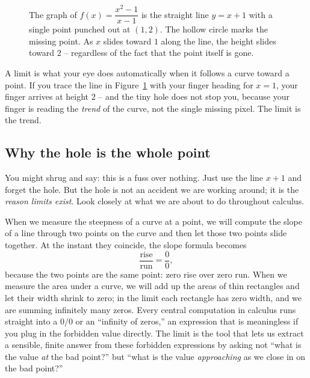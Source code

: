 \begin{figure}[H]
\centering
{}
\caption{The graph of $f(x)=\dfrac{x^2-1}{x-1}$ is the straight line $y=x+1$ with a single
point punched out at $(1,2)$. The hollow circle marks the missing point. As $x$ slides toward
$1$ along the line, the height slides toward $2$ -- regardless of the fact that the point
itself is gone.}
\label{ch05:hole}
\end{figure}

\begin{intuitionbox}
A limit is what your eye does automatically when it follows a curve toward a point. If you trace
the line in Figure~\ref{ch05:hole} with your finger heading for $x=1$, your finger arrives at
height $2$ -- and the tiny hole does not stop you, because your finger is reading the
\emph{trend} of the curve, not the single missing pixel. The limit is the trend.
\end{intuitionbox}

\subsection{Why the hole is the whole point}

You might shrug and say: this is a fuss over nothing. Just use the line $x+1$ and forget the
hole. But the hole is not an accident we are working around; it is the \emph{reason limits
exist}. Look closely at what we are about to do throughout calculus.

When we measure the steepness of a curve at a point, we will compute the slope of a line
through two points on the curve and then let those two points slide together. At the instant
they coincide, the slope formula becomes
\[
  \frac{\text{rise}}{\text{run}} = \frac{0}{0},
\]
because the two points are the same point: zero rise over zero run. When we measure the area
under a curve, we will add up the areas of thin rectangles and let their width shrink to zero;
in the limit each rectangle has zero width, and we are summing infinitely many zeros. Every
central computation in calculus runs straight into a $0/0$ or an ``infinity of zeros,'' an
expression that is meaningless if you plug in the forbidden value directly. The limit is the
tool that lets us extract a sensible, finite answer from these forbidden expressions by asking
not ``what is the value \emph{at} the bad point?'' but ``what is the value \emph{approaching} as
we close in on the bad point?''


